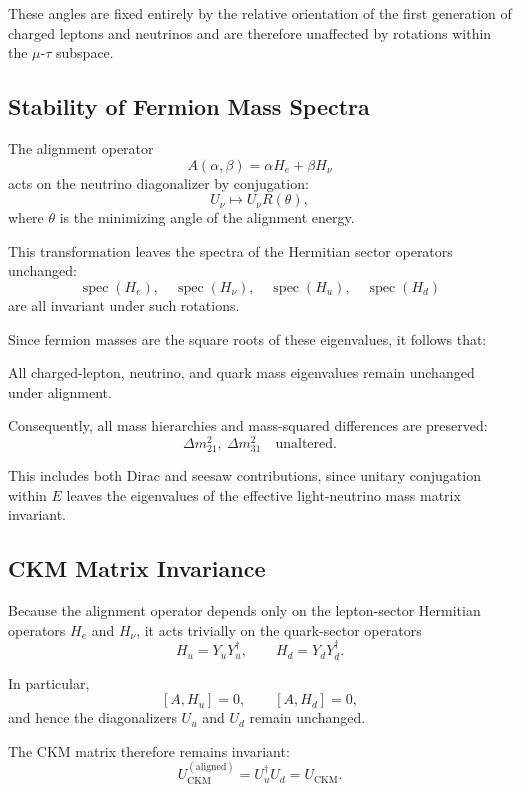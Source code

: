 These angles are fixed entirely by the relative orientation of the first generation of charged leptons and neutrinos and are therefore unaffected by rotations within the $\mu$-$\tau$ subspace.

\subsection{Stability of Fermion Mass Spectra}

The alignment operator
\[
A(\alpha,\beta)=\alpha H_e + \beta H_\nu
\]
acts on the neutrino diagonalizer by conjugation:
\[
U_\nu \longmapsto U_\nu R(\theta),
\]
where $\theta$ is the minimizing angle of the alignment energy.

This transformation leaves the spectra of the Hermitian sector operators unchanged:
\[
\operatorname{spec}(H_e),\quad
\operatorname{spec}(H_\nu),\quad
\operatorname{spec}(H_u),\quad
\operatorname{spec}(H_d)
\]
are all invariant under such rotations.

Since fermion masses are the square roots of these eigenvalues, it follows that:

\begin{proposition}
All charged-lepton, neutrino, and quark mass eigenvalues remain unchanged under alignment.
\end{proposition}

Consequently, all mass hierarchies and mass-squared differences are preserved:
\[
\Delta m_{21}^2,\ \Delta m_{31}^2 \quad \text{unaltered}.
\]

This includes both Dirac and seesaw contributions, since unitary conjugation within $E$ leaves the eigenvalues of the effective light-neutrino mass matrix invariant.

\subsection{CKM Matrix Invariance}

Because the alignment operator depends only on the lepton-sector Hermitian operators $H_e$ and $H_\nu$, it acts trivially on the quark-sector operators
\[
H_u = Y_u Y_u^\dagger,\qquad
H_d = Y_d Y_d^\dagger.
\]

In particular,
\[
[A,H_u]=0,\qquad
[A,H_d]=0,
\]
and hence the diagonalizers $U_u$ and $U_d$ remain unchanged.

The CKM matrix therefore remains invariant:
\[
U_{\mathrm{CKM}}^{(\mathrm{aligned})}
= U_u^\dagger U_d
= U_{\mathrm{CKM}}.
\]

